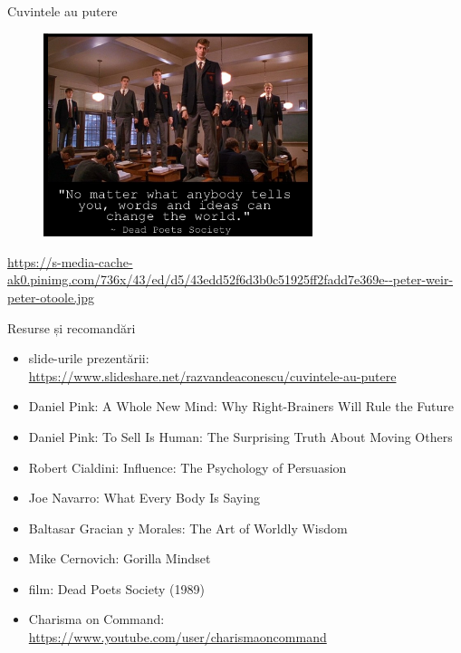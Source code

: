 \documentclass{beamer}
\begin{document}
\begin{frame}{Cuvintele au putere}
  \begin{figure}
    \centering
    \includegraphics[width=0.7\textwidth]{img/dead-poets-society-words-change}
  \end{figure}
  \begin{center}
    \tiny
    \url{https://s-media-cache-ak0.pinimg.com/736x/43/ed/d5/43edd52f6d3b0c51925ff2fadd7e369e--peter-weir-peter-otoole.jpg}
  \end{center}
\end{frame}

\begin{frame}{Resurse și recomandări}
  \begin{itemize}
    \item slide-urile prezentării: \url{https://www.slideshare.net/razvandeaconescu/cuvintele-au-putere}
    \item Daniel Pink: A Whole New Mind: Why Right-Brainers Will Rule the Future
    \item Daniel Pink: To Sell Is Human: The Surprising Truth About Moving Others
    \item Robert Cialdini: Influence: The Psychology of Persuasion
    \item Joe Navarro: What Every Body Is Saying
    \item Baltasar Gracian y Morales: The Art of Worldly Wisdom
    \item Mike Cernovich: Gorilla Mindset
    \item film: Dead Poets Society (1989)
    \item Charisma on Command: \url{https://www.youtube.com/user/charismaoncommand}
  \end{itemize}
\end{frame}
\end{document}
